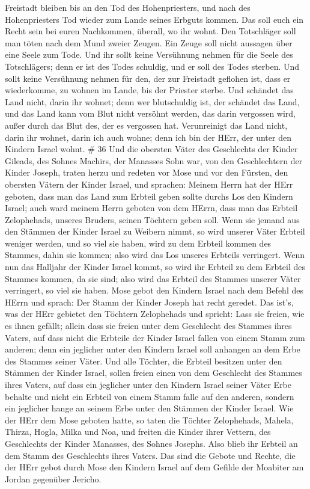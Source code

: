 Freistadt bleiben bis an den Tod des Hohenpriesters, und nach des
Hohenpriesters Tod wieder zum Lande seines Erbguts kommen. 
Das soll euch ein Recht sein bei euren Nachkommen, überall, wo ihr
wohnt.  Den Totschläger soll man töten nach dem Mund zweier
Zeugen. Ein Zeuge soll nicht aussagen über eine Seele zum Tode.
 Und ihr sollt keine Versühnung nehmen für die Seele des
Totschlägers; denn er ist des Todes schuldig, und er soll des Todes
sterben.  Und sollt keine Versühnung nehmen für den, der
zur Freistadt geflohen ist, dass er wiederkomme, zu wohnen im Lande, bis
der Priester sterbe.  Und schändet das Land nicht, darin
ihr wohnet; denn wer blutschuldig ist, der schändet das Land, und das
Land kann vom Blut nicht versöhnt werden, das darin vergossen wird,
außer durch das Blut des, der es vergossen hat. 
Verunreinigt das Land nicht, darin ihr wohnet, darin ich auch wohne;
denn ich bin der HErr, der unter den Kindern Israel wohnt. \# 36
 Und die obersten Väter des Geschlechts der Kinder Gileads,
des Sohnes Machirs, der Manasses Sohn war, von den Geschlechtern der
Kinder Joseph, traten herzu und redeten vor Mose und vor den Fürsten,
den obersten Vätern der Kinder Israel,  und sprachen: Meinem
Herrn hat der HErr geboten, dass man das Land zum Erbteil geben sollte
durchs Los den Kindern Israel; auch ward meinem Herrn geboten von dem
HErrn, dass man das Erbteil Zelophehads, unseres Bruders, seinen
Töchtern geben soll.  Wenn sie jemand aus den Stämmen der
Kinder Israel zu Weibern nimmt, so wird unserer Väter Erbteil weniger
werden, und so viel sie haben, wird zu dem Erbteil kommen des Stammes,
dahin sie kommen; also wird das Los unseres Erbteils verringert.
 Wenn nun das Halljahr der Kinder Israel kommt, so wird ihr
Erbteil zu dem Erbteil des Stammes kommen, da sie sind; also wird das
Erbteil des Stammes unserer Väter verringert, so viel sie haben.
 Mose gebot den Kindern Israel nach dem Befehl des HErrn und
sprach: Der Stamm der Kinder Joseph hat recht geredet.  Das
ist's, was der HErr gebietet den Töchtern Zelophehads und spricht: Lass
sie freien, wie es ihnen gefällt; allein dass sie freien unter dem
Geschlecht des Stammes ihres Vaters,  auf dass nicht die
Erbteile der Kinder Israel fallen von einem Stamm zum anderen; denn ein
jeglicher unter den Kindern Israel soll anhangen an dem Erbe des Stammes
seiner Väter.  Und alle Töchter, die Erbteil besitzen unter
den Stämmen der Kinder Israel, sollen freien einen von dem Geschlecht
des Stammes ihres Vaters, auf dass ein jeglicher unter den Kindern
Israel seiner Väter Erbe behalte  und nicht ein Erbteil von
einem Stamm falle auf den anderen, sondern ein jeglicher hange an seinem
Erbe unter den Stämmen der Kinder Israel.  Wie der HErr dem
Mose geboten hatte, so taten die Töchter Zelophehads, 
Mahela, Thirza, Hogla, Milka und Noa, und freiten die Kinder ihrer
Vettern,  des Geschlechts der Kinder Manasses, des Sohnes
Josephs. Also blieb ihr Erbteil an dem Stamm des Geschlechts ihres
Vaters.  Das sind die Gebote und Rechte, die der HErr gebot
durch Mose den Kindern Israel auf dem Gefilde der Moabiter am Jordan
gegenüber Jericho.
